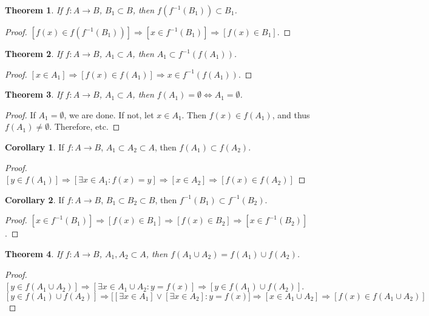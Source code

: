 \documentclass[oneside]{book}
\newtheorem{theorem}{Theorem}[section]
\theoremstyle{definition}
\newtheorem{corollary}{Corollary}[section]
\begin{document}
\begin{theorem}
If $f:A\rightarrow B$, $B_1\subset B$, then $f(f^{-1}(B_1))\subset B_1$.
\end{theorem}
\begin{proof}
$[f(x)\in f(f^{-1}(B_1))]\Rightarrow [x\in f^{-1}(B_1)]\Rightarrow [f(x)\in B_1]$.
\end{proof}

\begin{theorem}
If $f:A\rightarrow B$, $A_1\subset A$, then $A_1\subset f^{-1}(f(A_1))$.
\end{theorem}
\begin{proof}
$[x\in A_1]\Rightarrow [f(x) \in f(A_1)]\Rightarrow x\in f^{-1}(f(A_1))$.
\end{proof}

\begin{theorem}
If $f:A\rightarrow B$, $A_1\subset A$, then $f(A_1) = \emptyset \Leftrightarrow A_1 = \emptyset$.
\end{theorem}
\begin{proof}
If $A_1 = \emptyset$, we are done. If not, let $x\in A_1$. Then $f(x)\in f(A_1)$, and thus $f(A_1)\ne \emptyset$. Therefore, etc.
\end{proof}

\begin{corollary}
If $f:A\rightarrow B$, $A_1\subset A_2\subset A$, then $f(A_1)\subset f(A_2)$.
\end{corollary}
\begin{proof}
$[y\in f(A_1)]\Rightarrow[\exists x\in A_1:f(x)=y]\Rightarrow [x\in A_2] \Rightarrow [f(x)\in f(A_2)]$
\end{proof}

\begin{corollary}
If $f:A\rightarrow B$, $B_1\subset B_2\subset B$, then $f^{-1}(B_1)\subset f^{-1}(B_2)$.
\end{corollary}
\begin{proof}
$[x\in f^{-1}(B_1)] \Rightarrow [f(x) \in B_1] \Rightarrow [f(x) \in B_2]\Rightarrow [x\in f^{-1}(B_2)]$.
\end{proof}

\begin{theorem}
If $f:A\rightarrow B$, $A_1,A_2\subset A$, then $f(A_1 \cup A_2) = f(A_1)\cup f(A_2)$.
\end{theorem}
\begin{proof}
$[y\in f(A_1\cup A_2)]\Rightarrow [\exists x\in A_1 \cup A_2:y=f(x)]\Rightarrow [y \in f(A_1)\cup f(A_2)]$. $[y\in f(A_1)\cup f(A_2)]\Rightarrow \big[[\exists x\in A_1] \lor [\exists x\in A_2]: y=f(x)\big]\Rightarrow [x\in A_1\cup A_2]\Rightarrow [f(x)\in f(A_1\cup A_2)]$
\end{proof}
\end{document}
